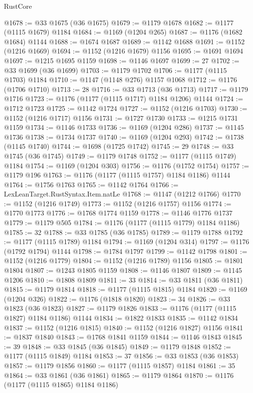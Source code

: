 \begin{lexlean}{RustCore}
\begin{coremodule}
@1678 := @33 @1675 (@36 @1675)
@1679 := @1179 @1678
@1682 := @1177 (@1115 @1679) @1184
@1684 := @1169 (@1204 @265)
@1687 := @1176 (@1682 @1684) @1144
@1688 := @1674 @1687
@1689 := @1142 @1688
@1691 := @1152 (@1216 @1669)
@1694 := @1152 (@1216 @1679) @1156
@1695 := @1691 @1694
@1697 := @1215 @1695 @1159
@1698 := @1146 @1697
@1699 := 27
@1702 := @33 @1699 (@36 @1699)
@1703 := @1179 @1702
@1706 := @1177 (@1115 @1703) @1184
@1710 := @1147 (@1148 @276) @1157 @1068
@1712 := @1176 (@1706 @1710)
@1713 := 28
@1716 := @33 @1713 (@36 @1713)
@1717 := @1179 @1716
@1723 := @1176 (@1177 (@1115 @1717) @1184 @1206) @1144
@1724 := @1712 @1723
@1725 := @1142 @1724
@1727 := @1152 (@1216 @1703)
@1730 := @1152 (@1216 @1717) @1156
@1731 := @1727 @1730
@1733 := @1215 @1731 @1159
@1734 := @1146 @1733
@1736 := @1169 (@1204 @286)
@1737 := @1145 @1736
@1738 := @1734 @1737
@1740 := @1169 (@1204 @293)
@1742 := @1738 (@1145 @1740)
@1744 := @1698 (@1725 @1742)
@1745 := 29
@1748 := @33 @1745 (@36 @1745)
@1749 := @1179 @1748
@1752 := @1177 (@1115 @1749) @1184
@1754 := @1169 (@1204 @303)
@1756 := @1176 (@1752 @1754)
@1757 := @1179 @196
@1763 := @1176 (@1177 (@1115 @1757) @1184 @1186) @1144
@1764 := @1756 @1763
@1765 := @1142 @1764
@1766 := LexLeanTarget.RustSyntax.Item.natLe
@1768 := @1147 (@1212 @1766)
@1770 := @1152 (@1216 @1749)
@1773 := @1152 (@1216 @1757) @1156
@1774 := @1770 @1773
@1776 := @1768 @1774 @1159
@1778 := @1146 @1776 @1737
@1779 := @1179 @505
@1784 := @1176 (@1177 (@1115 @1779) @1184 @1186)
@1785 := 32
@1788 := @33 @1785 (@36 @1785)
@1789 := @1179 @1788
@1792 := @1177 (@1115 @1789) @1184
@1794 := @1169 (@1204 @314)
@1797 := @1176 (@1792 @1794) @1144
@1798 := @1784 @1797
@1799 := @1142 @1798
@1801 := @1152 (@1216 @1779)
@1804 := @1152 (@1216 @1789) @1156
@1805 := @1801 @1804
@1807 := @1243 @1805 @1159
@1808 := @1146 @1807
@1809 := @1145 @1206
@1810 := @1808 @1809
@1811 := 33
@1814 := @33 @1811 (@36 @1811)
@1815 := @1179 @1814
@1818 := @1177 (@1115 @1815) @1184
@1820 := @1169 (@1204 @326)
@1822 := @1176 (@1818 @1820)
@1823 := 34
@1826 := @33 @1823 (@36 @1823)
@1827 := @1179 @1826
@1833 := @1176 (@1177 (@1115 @1827) @1184 @1186) @1144
@1834 := @1822 @1833
@1835 := @1142 @1834
@1837 := @1152 (@1216 @1815)
@1840 := @1152 (@1216 @1827) @1156
@1841 := @1837 @1840
@1843 := @1768 @1841 @1159
@1844 := @1146 @1843
@1845 := 39
@1848 := @33 @1845 (@36 @1845)
@1849 := @1179 @1848
@1852 := @1177 (@1115 @1849) @1184
@1853 := 37
@1856 := @33 @1853 (@36 @1853)
@1857 := @1179 @1856
@1860 := @1177 (@1115 @1857) @1184
@1861 := 35
@1864 := @33 @1861 (@36 @1861)
@1865 := @1179 @1864
@1870 := @1176 (@1177 (@1115 @1865) @1184 @1186)

\end{coremodule}
\end{lexlean}
